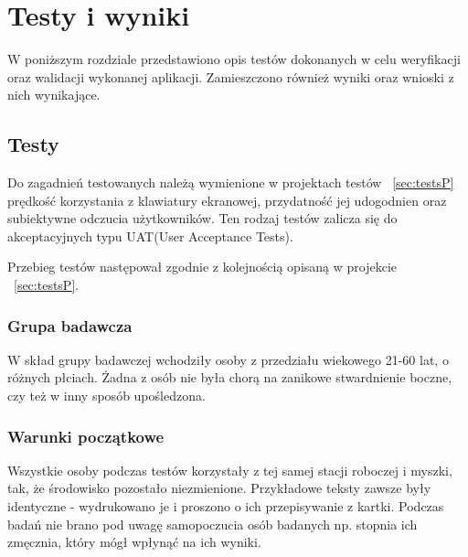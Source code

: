 \documentclass[twoside,a4paper]{book}
\begin{document}
\chapter{Testy i wyniki}
W poniższym rozdziale przedstawiono opis testów dokonanych w celu weryfikacji oraz walidacji wykonanej aplikacji. Zamieszczono również wyniki oraz wnioski z nich wynikające.
\section{Testy}
Do zagadnień testowanych należą wymienione w projektach testów ~\ref{sec:testsP} prędkość korzystania z klawiatury ekranowej, przydatność jej udogodnien oraz subiektywne odczucia użytkowników. Ten rodzaj testów zalicza się do akceptacyjnych typu UAT(User Acceptance Tests). 

Przebieg testów następował zgodnie z kolejnością opisaną w projekcie ~\ref{sec:testsP}.
\subsection{Grupa badawcza}
W skład grupy badawczej wchodziły osoby z przedziału wiekowego 21-60 lat, o różnych płciach. Żadna z osób nie była chorą na zanikowe stwardnienie boczne, czy też w inny sposób upośledzona.
\subsection{Warunki początkowe}
Wszystkie osoby podczas testów korzystały z tej samej stacji roboczej i myszki, tak, że środowisko pozostało niezmienione. Przykładowe teksty zawsze były identyczne - wydrukowano je i proszono o ich przepisywanie z kartki. Podczas badań nie brano pod uwagę samopoczucia osób badanych np. stopnia ich zmęcznia, który mógł wpłynąć na ich wyniki. 
\end{document}
